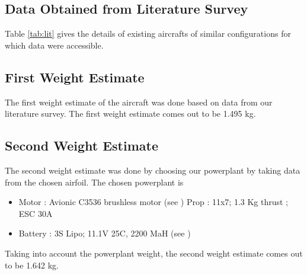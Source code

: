 \documentclass[a4paper,10pt]{article}
\begin{document}
\subsection{Data Obtained from Literature Survey}
Table \ref{tab:lit} gives the details of existing aircrafts of similar configurations for which data were accessible.

%
\begin{table}[H]
\centering
{}
\caption{Data of similar airplanes\cite{5}}
\label{tab:lit}
\end{table}
%
\subsection{First Weight Estimate}
The first weight estimate of the aircraft was done based on data from our literature survey. The first weight estimate comes out to be 1.495 kg. 
\subsection{Second Weight Estimate}
The second weight estimate was done by choosing our powerplant by taking data from the chosen airfoil. The chosen powerplant is 
\begin{itemize}
\item Motor : Avionic C3536 brushless motor (see \cite{1}) Prop : 11x7; 1.3 Kg thrust ; ESC 30A
\item Battery : 3S Lipo; 11.1V 25C, 2200 MaH (see \cite{2})
\end{itemize}
Taking into account the powerplant weight, the second weight estimate comes out to be 1.642 kg.
%
\end{document}
